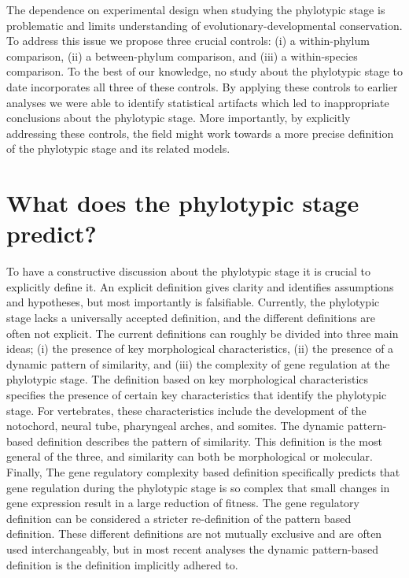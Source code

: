 The dependence on experimental design when studying the phylotypic stage is problematic and limits understanding of evolutionary-developmental conservation. To address this issue we propose three crucial controls: (i) a within-phylum comparison, (ii) a between-phylum comparison, and (iii) a within-species comparison. To the best of our knowledge, no study about the phylotypic stage to date incorporates all three of these controls. By applying these controls to earlier analyses we were able to identify statistical artifacts which led to inappropriate conclusions about the phylotypic stage. More importantly, by explicitly addressing these controls, the field might work towards a more precise definition of the phylotypic stage and its related models.

\section{What does the phylotypic stage predict?}

To have a constructive discussion about the phylotypic stage it is crucial to explicitly define it. An explicit definition gives clarity and identifies assumptions and hypotheses, but most importantly is falsifiable. Currently, the phylotypic stage lacks a universally accepted definition, and the different definitions are often not explicit. The current definitions can roughly be divided into three main ideas; (i) the presence of key morphological characteristics, (ii) the presence of a dynamic pattern of similarity, and (iii) the complexity of gene regulation at the phylotypic stage\cite{OlafRP2003}. The definition based on key morphological characteristics specifies the presence of certain key characteristics that identify the phylotypic stage. For vertebrates, these characteristics include the development of the notochord, neural tube, pharyngeal arches, and somites\cite{Kimmel1995}. The dynamic pattern-based definition describes the pattern of similarity. This definition is the most general of the three, and similarity can both be morphological or molecular\cite{Slack1993,Duboule1994}. Finally, The gene regulatory complexity based definition specifically predicts that gene regulation during the phylotypic stage is so complex that small changes in gene expression result in a large reduction of fitness\cite{raff1996}. The gene regulatory definition can be considered a stricter re-definition of the pattern based definition. These different definitions are not mutually exclusive and are often used interchangeably, but in most recent analyses the dynamic pattern-based definition is the definition implicitly adhered to.

